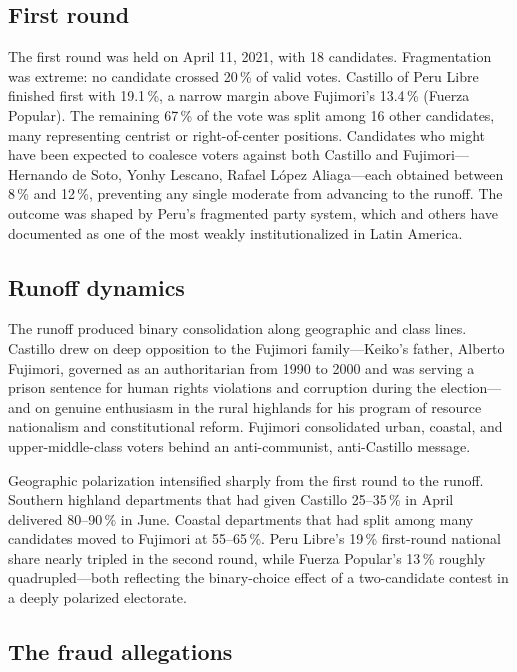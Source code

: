 \documentclass[12pt]{article}
\begin{document}
\subsection{First round}

The first round was held on April 11, 2021, with 18 candidates. Fragmentation
was extreme: no candidate crossed 20\,\% of valid votes. Castillo of Peru
Libre finished first with 19.1\,\%, a narrow margin above Fujimori's 13.4\,\%
(Fuerza Popular). The remaining 67\,\% of the vote was split among 16 other
candidates, many representing centrist or right-of-center positions. Candidates
who might have been expected to coalesce voters against both Castillo and
Fujimori---Hernando de Soto, Yonhy Lescano, Rafael L\'opez Aliaga---each
obtained between 8\,\% and 12\,\%, preventing any single moderate from
advancing to the runoff. The outcome was shaped by Peru's fragmented party
system, which \citet{mainwaring2018} and others have documented as one of the
most weakly institutionalized in Latin America.

\subsection{Runoff dynamics}

The runoff produced binary consolidation along geographic and class lines.
Castillo drew on deep opposition to the Fujimori family---Keiko's father,
Alberto Fujimori, governed as an authoritarian from 1990 to 2000 and was
serving a prison sentence for human rights violations and corruption during the
election---and on genuine enthusiasm in the rural highlands for his program of
resource nationalism and constitutional reform. Fujimori consolidated urban,
coastal, and upper-middle-class voters behind an anti-communist, anti-Castillo
message.

Geographic polarization intensified sharply from the first round to the
runoff. Southern highland departments that had given Castillo 25--35\,\% in
April delivered 80--90\,\% in June. Coastal departments that had split among
many candidates moved to Fujimori at 55--65\,\%. Peru Libre's 19\,\% first-round
national share nearly tripled in the second round, while Fuerza Popular's
13\,\% roughly quadrupled---both reflecting the binary-choice effect of a
two-candidate contest in a deeply polarized electorate.

\subsection{The fraud allegations}
\end{document}
